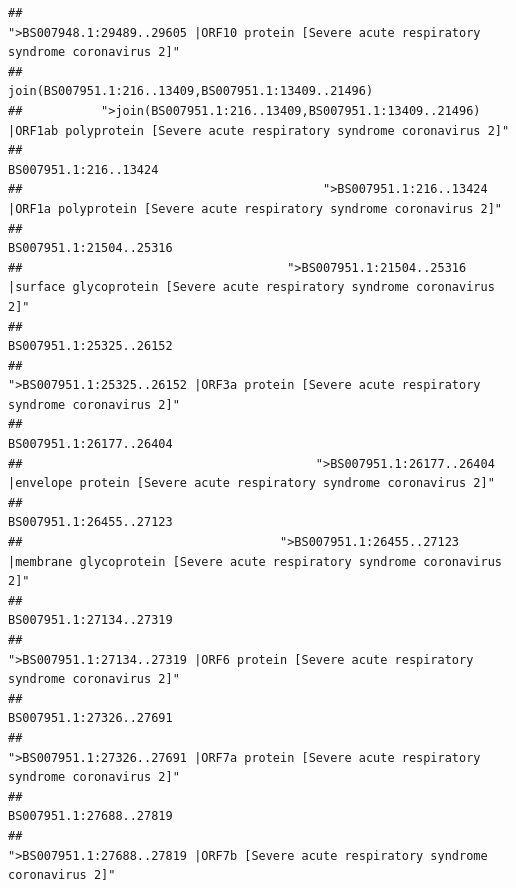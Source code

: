 \documentclass[
]{article}
\begin{document}
\begin{verbatim}
##                                            ">BS007948.1:29489..29605 |ORF10 protein [Severe acute respiratory syndrome coronavirus 2]" 
##                                                                                    join(BS007951.1:216..13409,BS007951.1:13409..21496) 
##           ">join(BS007951.1:216..13409,BS007951.1:13409..21496) |ORF1ab polyprotein [Severe acute respiratory syndrome coronavirus 2]" 
##                                                                                                                  BS007951.1:216..13424 
##                                          ">BS007951.1:216..13424 |ORF1a polyprotein [Severe acute respiratory syndrome coronavirus 2]" 
##                                                                                                                BS007951.1:21504..25316 
##                                     ">BS007951.1:21504..25316 |surface glycoprotein [Severe acute respiratory syndrome coronavirus 2]" 
##                                                                                                                BS007951.1:25325..26152 
##                                            ">BS007951.1:25325..26152 |ORF3a protein [Severe acute respiratory syndrome coronavirus 2]" 
##                                                                                                                BS007951.1:26177..26404 
##                                         ">BS007951.1:26177..26404 |envelope protein [Severe acute respiratory syndrome coronavirus 2]" 
##                                                                                                                BS007951.1:26455..27123 
##                                    ">BS007951.1:26455..27123 |membrane glycoprotein [Severe acute respiratory syndrome coronavirus 2]" 
##                                                                                                                BS007951.1:27134..27319 
##                                             ">BS007951.1:27134..27319 |ORF6 protein [Severe acute respiratory syndrome coronavirus 2]" 
##                                                                                                                BS007951.1:27326..27691 
##                                            ">BS007951.1:27326..27691 |ORF7a protein [Severe acute respiratory syndrome coronavirus 2]" 
##                                                                                                                BS007951.1:27688..27819 
##                                                    ">BS007951.1:27688..27819 |ORF7b [Severe acute respiratory syndrome coronavirus 2]" 

\end{verbatim}
\end{document}
